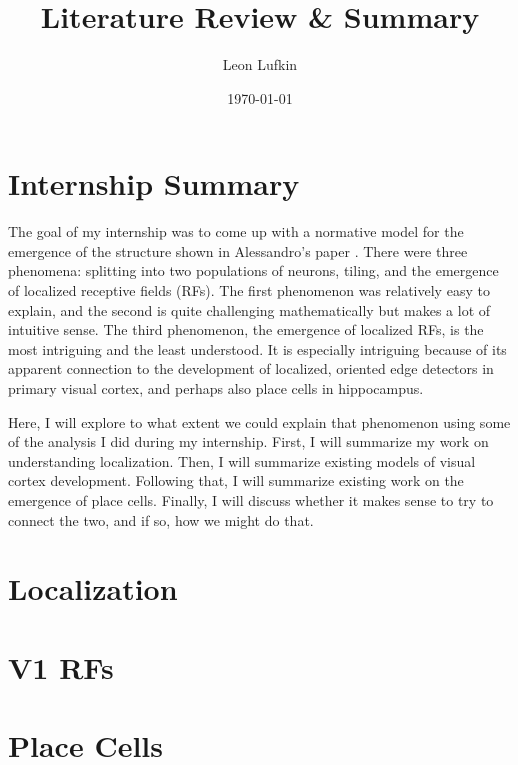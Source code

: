 \documentclass{article}
\title{Literature Review \& Summary}
\author{Leon Lufkin}
\date{\today}
\begin{document}
\section{Internship Summary}
\label{sec:internship_summary}
The goal of my internship was to come up with a normative model for the emergence of the structure shown in Alessandro's paper \cite{ingrosso2022data}.
There were three phenomena: splitting into two populations of neurons, tiling, and the emergence of localized receptive fields (RFs).
The first phenomenon was relatively easy to explain, and the second is quite challenging mathematically but makes a lot of intuitive sense.
The third phenomenon, the emergence of localized RFs, is the most intriguing and the least understood.
It is especially intriguing because of its apparent connection to the development of localized, oriented edge detectors in primary visual cortex, and perhaps also place cells in hippocampus.

Here, I will explore to what extent we could explain that phenomenon using some of the analysis I did during my internship.
First, I will summarize my work on understanding localization.
Then, I will summarize existing models of visual cortex development.
Following that, I will summarize existing work on the emergence of place cells.
Finally, I will discuss whether it makes sense to try to connect the two, and if so, how we might do that.

\section{Localization}
\label{sec:localization}


\section{V1 RFs}
\label{sec:v1_rfs}


\section{Place Cells}
\label{sec:place_cells}




\end{document}
